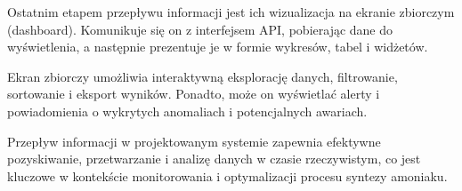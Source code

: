 Ostatnim etapem przepływu informacji jest ich wizualizacja na ekranie zbiorczym (dashboard). Komunikuje się on z interfejsem API, pobierając dane do wyświetlenia, a następnie prezentuje je w formie wykresów, tabel i widżetów.

Ekran zbiorczy umożliwia interaktywną eksplorację danych, filtrowanie, sortowanie i eksport wyników. Ponadto, może on wyświetlać alerty i powiadomienia o wykrytych anomaliach i potencjalnych awariach.

Przepływ informacji w projektowanym systemie zapewnia efektywne pozyskiwanie, przetwarzanie i analizę danych w czasie rzeczywistym, co jest kluczowe w kontekście monitorowania i optymalizacji procesu syntezy amoniaku. 